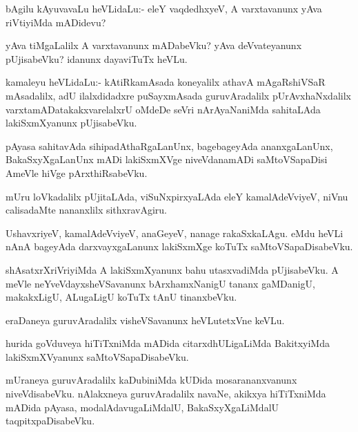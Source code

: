 \begin{mng}
bAgilu kAyuvavaLu heVLidaLu:- eleY vaqdedhxyeV, A varxtavanunx yAva riVtiyiMda mADidevu?
\end{mng}

\begin{mng}
yAva tiMgaLalilx A varxtavanunx mADabeVku? yAva deVvateyanunx pUjisabeVku? idanunx dayaviTuTx heVLu.
\end{mng}

\begin{mng}
kamaleyu heVLidaLu:- kAtiRkamAsada koneyalilx athavA mAgaRshiVSaR mAsadalilx, adU ilalxdidadxre puSayxmAsada guruvAradalilx pUrAvxhaNxdalilx varxtamADatakakxvarelalxrU oMdeDe seVri nArAyaNaniMda sahitaLAda lakiSxmXyanunx pUjisabeVku.
\end{mng}

\begin{mng}
pAyasa sahitavAda sihipadAthaRgaLanUnx, bagebageyAda ananxgaLanUnx, BakaSxyXgaLanUnx mADi lakiSxmXVge niveVdanamADi saMtoVSapaDisi AmeVle hiVge pArxthiRsabeVku.
\end{mng}

\begin{mng}
mUru loVkadalilx pUjitaLAda, viSuNxpirxyaLAda eleY kamalAdeVviyeV, niVnu calisadaMte nananxlilx sithxravAgiru.
\end{mng}

\begin{mng}
UshavxriyeV, kamalAdeVviyeV, anaGeyeV, nanage rakaSxkaLAgu. eMdu heVLi nAnA bageyAda darxvayxgaLanunx lakiSxmXge koTuTx saMtoVSapaDisabeVku.
\end{mng}

\begin{mng}
shAsatxrXriVriyiMda A lakiSxmXyanunx bahu utasxvadiMda pUjisabeVku. A meVle neYveVdayxsheVSavanunx bArxhamxNanigU tananx gaMDanigU, makakxLigU, ALugaLigU koTuTx tAnU tinanxbeVku.
\end{mng}

\begin{mng}
eraDaneya guruvAradalilx visheVSavanunx heVLutetxVne keVLu.
\end{mng}

\begin{mng}
hurida goVduveya hiTiTxniMda mADida citarxdhULigaLiMda BakitxyiMda lakiSxmXVyanunx saMtoVSapaDisabeVku. 
\end{mng}

\begin{mng}
mUraneya guruvAradalilx kaDubiniMda kUDida mosarananxvanunx niveVdisabeVku. nAlakxneya guruvAradalilx navaNe, akikxya hiTiTxniMda mADida pAyasa, modalAdavugaLiMdalU, BakaSxyXgaLiMdalU taqpitxpaDisabeVku.
\end{mng}

